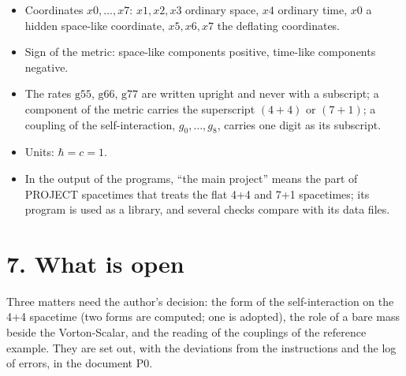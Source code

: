 \documentclass[
  10pt,
]{article}
\providecommand{\tightlist}{%
  \setlength{\itemsep}{0pt}\setlength{\parskip}{0pt}}
\begin{document}
\begin{itemize}
\tightlist
\item
  Coordinates \(x0,\dots,x7\): \(x1,x2,x3\) ordinary space, \(x4\)
  ordinary time, \(x0\) a hidden space-like coordinate, \(x5,x6,x7\) the
  deflating coordinates.
\item
  Sign of the metric: space-like components positive, time-like
  components negative.
\item
  The rates \(\mathrm{g55}\), \(\mathrm{g66}\), \(\mathrm{g77}\) are
  written upright and never with a subscript; a component of the metric
  carries the superscript \((4+4)\) or \((7+1)\); a coupling of the
  self-interaction, \(g_0,\dots,g_8\), carries one digit as its
  subscript.
\item
  Units: \(\hbar=c=1\).
\item
  In the output of the programs, ``the main project'' means the part of
  PROJECT spacetimes that treats the flat 4+4 and 7+1 spacetimes; its
  program is used as a library, and several checks compare with its data
  files.
\end{itemize}

\hypertarget{what-is-open}{%
\section{7. What is open}\label{what-is-open}}

Three matters need the author's decision: the form of the
self-interaction on the 4+4 spacetime (two forms are computed; one is
adopted), the role of a bare mass beside the Vorton-Scalar, and the
reading of the couplings of the reference example. They are set out,
with the deviations from the instructions and the log of errors, in the
document P0.
\end{document}
